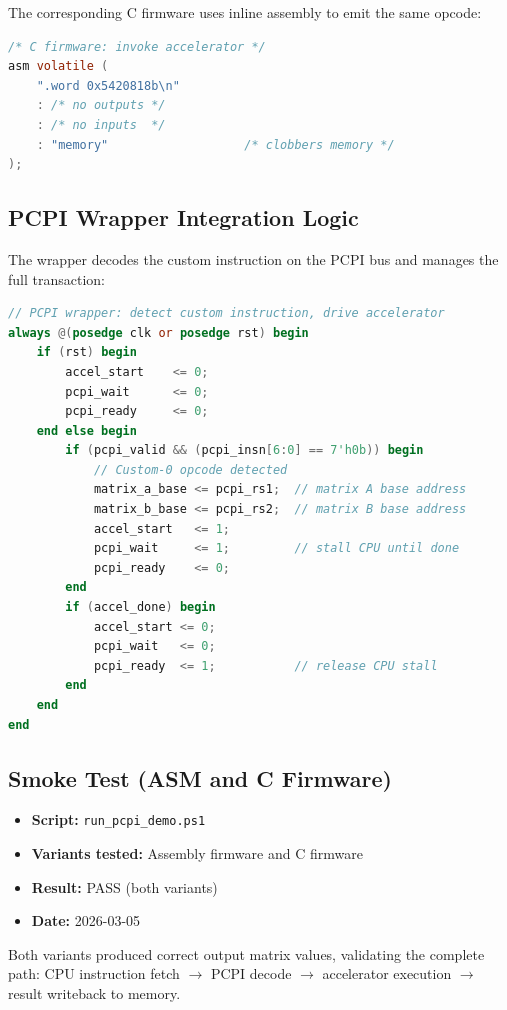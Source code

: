 ﻿\documentclass[12pt,a4paper]{report}
\begin{document}
The corresponding C firmware uses inline assembly to emit the same opcode:

\begin{lstlisting}[language=C]
/* C firmware: invoke accelerator */
asm volatile (
    ".word 0x5420818b\n"
    : /* no outputs */
    : /* no inputs  */
    : "memory"                   /* clobbers memory */
);
\end{lstlisting}

\subsection{PCPI Wrapper Integration Logic}

The wrapper decodes the custom instruction on the PCPI bus and manages the full transaction:

\begin{lstlisting}[language=Verilog]
// PCPI wrapper: detect custom instruction, drive accelerator
always @(posedge clk or posedge rst) begin
    if (rst) begin
        accel_start    <= 0;
        pcpi_wait      <= 0;
        pcpi_ready     <= 0;
    end else begin
        if (pcpi_valid && (pcpi_insn[6:0] == 7'h0b)) begin
            // Custom-0 opcode detected
            matrix_a_base <= pcpi_rs1;  // matrix A base address
            matrix_b_base <= pcpi_rs2;  // matrix B base address
            accel_start   <= 1;
            pcpi_wait     <= 1;         // stall CPU until done
            pcpi_ready    <= 0;
        end
        if (accel_done) begin
            accel_start <= 0;
            pcpi_wait   <= 0;
            pcpi_ready  <= 1;           // release CPU stall
        end
    end
end
\end{lstlisting}

\subsection{Smoke Test (ASM and C Firmware)}

\begin{itemize}
    \item \textbf{Script:} \texttt{run\_pcpi\_demo.ps1}
    \item \textbf{Variants tested:} Assembly firmware and C firmware
    \item \textbf{Result:} PASS (both variants)
    \item \textbf{Date:} 2026-03-05
\end{itemize}

Both variants produced correct output matrix values, validating the complete path: CPU instruction fetch $\rightarrow$ PCPI decode $\rightarrow$ accelerator execution $\rightarrow$ result writeback to memory.
\end{document}
